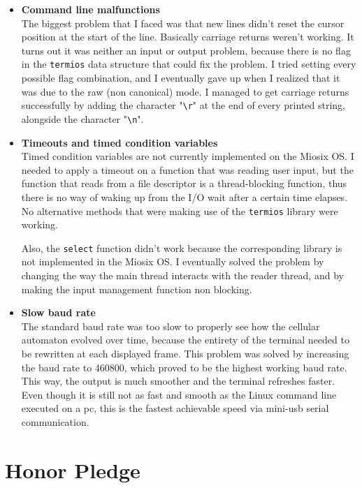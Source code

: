 \documentclass[10pt]{article}
\begin{document}
\begin{itemize}
    \item \textbf{Command line malfunctions}\\
    The biggest problem that I faced was that new lines didn't reset the cursor position at the start of the line. 
    Basically carriage returns weren't working.
    It turns out it was neither an input or output problem, because there is no flag in the \verb|termios| data structure that could fix the problem.
    I tried setting every possible flag combination, and I eventually gave up when I realized that it was due to the raw (non canonical) mode.
    I managed to get carriage returns successfully by adding the character "\verb|\r|" at the end of every printed string, alongside the character "\verb|\n|".
    
    \item \textbf{Timeouts and timed condition variables}\\
    Timed condition variables are not currently implemented on the Miosix OS.
    I needed to apply a timeout on a function that was reading user input, but the function that reads from a file descriptor is a thread-blocking function, thus there is no way of waking up from the I/O wait after a certain time elapses.
    No alternative methods that were making use of the \verb|termios| library were working. 
    
    Also, the \verb|select| function didn't work because the corresponding library is not implemented in the Miosix OS.
    I eventually solved the problem by changing the way the main thread interacts with the reader thread, and by making the input management
    function non blocking. 
    
    \item \textbf{Slow baud rate}\\
    The standard baud rate was too slow to properly see how the cellular automaton evolved over time, because the entirety of the terminal needed to be rewritten at each displayed frame. 
    This problem was solved by increasing the baud rate to 460800, which proved to be the highest working baud rate. This way, the output is much smoother and the terminal refreshes faster.
    Even though it is still not as fast and smooth as the Linux command line executed on a pc, this is the fastest achievable speed via mini-usb serial communication.

\end{itemize}
    
    
\section{Honor Pledge}
\end{document}
